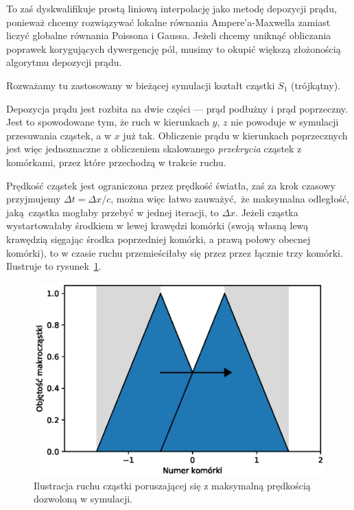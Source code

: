 
To zaś dyskwalifikuje prostą liniową interpolację jako metodę depozycji
prądu, ponieważ chcemy rozwiązywać lokalne równania Ampere'a-Maxwella
zamiast liczyć globalne równania Poissona i Gaussa.
Jeżeli chcemy uniknąć obliczania poprawek korygujących dywergencję pól,
musimy to okupić większą złożonością algorytmu depozycji prądu.

Rozważamy tu zastosowany w bieżącej symulacji kształt cząstki $S_1$ (trójkątny).

Depozycja prądu jest rozbita na dwie części --- prąd podłużny i prąd
poprzeczny. Jest to spowodowane tym, że ruch w kierunkach $y$, $z$ nie
powoduje w symulacji przesuwania cząstek, a w $x$ już tak. Obliczenie prądu
w kierunkach poprzecznych jest więc jednoznaczne z obliczeniem skalowanego
\emph{przekrycia} cząstek z komórkami, przez które przechodzą w trakcie
ruchu.

Prędkość cząstek jest ograniczona przez prędkość światła, zaś za krok czasowy
przyjmujemy $\Delta t = \Delta x/c$, można więc łatwo zauważyć, że maksymalna
odległość, jaką cząstka mogłaby przebyć w jednej iteracji, to $\Delta x$.
Jeżeli cząstka wystartowałaby środkiem w lewej krawędzi komórki (swoją
własną lewą krawędzią sięgając środka poprzedniej komórki, a prawą połowy
obecnej komórki), to w czasie ruchu przemieściłaby się przez
przez łącznie trzy komórki. Ilustruje to rysunek~\ref{fig:deposition-movement}.

\begin{figure}[h!]
  \includegraphics[width=\textwidth]{Images/deposition-movement}
  \caption{Ilustracja ruchu cząstki poruszającej się z maksymalną prędkością dozwoloną w symulacji.\label{fig:deposition-movement}}
\end{figure}

